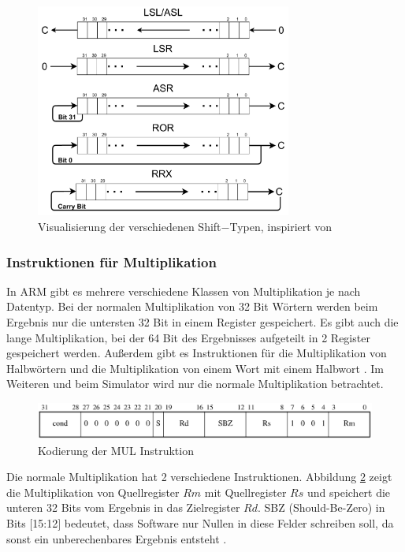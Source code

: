 \documentclass[a4paper, 11pt, onecolumn]{article}
\begin{document}
\begin{figure}[!htb]
\centering
\includegraphics[width=0.75\textwidth]{data/shift}
\caption{Visualisierung der verschiedenen Shift$-$Typen, inspiriert von \cite{assembly}}
\label{fig:shift}
\end{figure}

\subsubsection{Instruktionen für Multiplikation}

In ARM gibt es mehrere verschiedene Klassen von Multiplikation je nach Datentyp. Bei der normalen Multiplikation von 32 Bit Wörtern werden beim Ergebnis nur die untersten 32 Bit in einem Register gespeichert. Es gibt auch die lange Multiplikation, bei der 64 Bit des Ergebnisses aufgeteilt in 2 Register gespeichert werden. Außerdem gibt es Instruktionen für die  Multiplikation von Halbwörtern und die Multiplikation von einem Wort mit einem Halbwort \cite{arm:2005}. Im Weiteren und beim Simulator wird nur die normale Multiplikation betrachtet.

\begin{figure}[!htb]
\centering
\includegraphics[width=1\textwidth]{data/mul}
\caption{Kodierung der MUL Instruktion \cite{arm:2005}}
\label{fig:mul}
\end{figure}

Die normale Multiplikation hat 2 verschiedene Instruktionen. Abbildung \ref{fig:mul} zeigt die Multiplikation von Quellregister $Rm$ mit Quellregister $Rs$ und speichert die unteren 32 Bits vom Ergebnis in das Zielregister $Rd$. SBZ (Should-Be-Zero) in Bits $[$15:12$]$ bedeutet, dass Software nur Nullen in diese Felder schreiben soll, da sonst ein unberechenbares Ergebnis entsteht \cite{arm:2005}.
\end{document}
